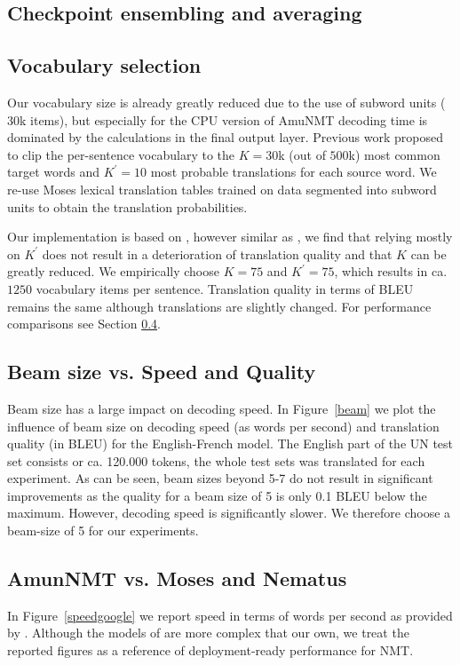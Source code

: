 \documentclass[11pt]{article}
\begin{document}
\subsection{Checkpoint ensembling and averaging}
\subsection{Vocabulary selection}
Our vocabulary size is already greatly reduced due to the use of subword units ($30$k items), but especially for the CPU version of AmuNMT decoding time is dominated by the calculations in the final output layer. 
Previous work \cite{DBLP:conf/acl/JeanCMB15} proposed to clip the per-sentence vocabulary to the $K=30$k (out of $500$k) most common target words and $K^{\prime}=10$ most probable translations for each source word. We re-use Moses lexical translation tables trained on data segmented into subword units to obtain the translation probabilities.

Our implementation is based on \cite{DBLP:conf/acl/JeanCMB15}, however similar as \cite{DBLP:conf/acl/MiWI16}, we find that relying mostly on $K^{\prime}$  does not result in a deterioration of translation quality and that $K$ can be greatly reduced. We empirically choose $K=75$ and $K^{\prime}=75$, which results in ca.~$1250$ vocabulary items per sentence.  
Translation quality in terms of BLEU remains the same although translations are slightly changed. For performance comparisons see Section \ref{comparespeed}.

\subsection{Beam size vs. Speed and Quality}

Beam size has a large impact on decoding speed. In Figure~\ref{beam} we plot the influence of beam size on decoding speed (as words per second) and translation quality (in BLEU) for the English-French model. The English part of the UN test set consists or ca. 120.000 tokens, the whole test sets was translated for each experiment. As can be seen, beam sizes beyond 5-7 do not result in significant improvements as the quality for a beam size of 5 is only 0.1 BLEU below the maximum. However, decoding speed is significantly slower. We therefore choose a beam-size of 5 for our experiments.  

\subsection{AmunNMT vs. Moses and Nematus}
\label{comparespeed}
In Figure~\ref{speedgoogle} we report speed in terms of words per second as provided by \cite{google}. Although the models of \cite{google} are more complex that our own, we treat the reported figures as a reference of deployment-ready performance for NMT. 
\end{document}
